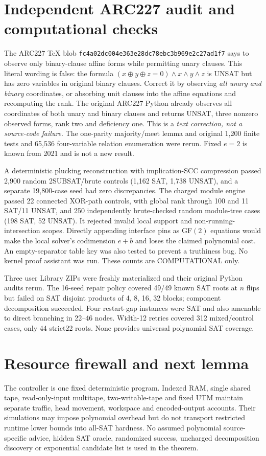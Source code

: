 \documentclass[11pt]{article}
\begin{document}
\section{Independent ARC227 audit and computational checks}
The ARC227 TeX blob
\texttt{fc4a02dc004e363e28dc78ebc3b969e2c27ad1f7}
says to observe only binary-clause affine forms while permitting
unary clauses. This literal wording is false: the formula
$(x\oplus y\oplus z=0)\land x\land y\land z$ is UNSAT but
has zero variables in original binary clauses. Correct it by
observing \emph{all unary and binary} coordinates, or
absorbing unit clauses into the affine equations and recomputing
the rank. The original ARC227 Python already observes all
coordinates of both unary and binary clauses and returns UNSAT,
three nonzero observed forms, rank two and deficiency one.
This is a \emph{text correction, not a source-code failure}.
The one-parity majority/meet lemma and original 1,200 finite
tests and 65,536 four-variable relation enumeration were rerun.
Fixed $e=2$ is known from 2021 and is not a new result.

A deterministic plucking reconstruction with implication-SCC
compression passed 2,900 random 2SUBSAT/brute controls
(1,162 SAT, 1,738 UNSAT), and a separate 19,800-case seed
had zero discrepancies. The charged module engine passed
22 connected XOR-path controls, with global rank through 100
and 11 SAT/11 UNSAT, and 250 independently brute-checked
random module-tree cases (198 SAT, 52 UNSAT). It rejected
invalid local support and non-running-intersection scopes.
Directly appending interface pins as GF$(2)$ equations would
make the local solver's codimension $e+b$ and loses the
claimed polynomial cost. An empty-separator table key was
also tested to prevent a truthiness bug. No kernel proof
assistant was run. These counts are COMPUTATIONAL only.

Three user Library ZIPs were freshly materialized and their
original Python audits rerun. The 16-seed repair policy covered
49/49 known SAT roots at $n$ flips but failed on SAT disjoint
products of 4, 8, 16, 32 blocks; component decomposition
succeeded. Four restart-gap instances were SAT and also
amenable to direct branching in 22--46 nodes. Width-12
retries covered 312 mixed/control cases, only 44 strict22
roots. None provides universal polynomial SAT coverage.

\section{Resource firewall and next lemma}
The controller is one fixed deterministic program.
Indexed RAM, single shared tape, read-only-input multitape,
two-writable-tape and fixed UTM maintain separate traffic,
head movement, workspace and encoded-output accounts.
Their simulations may impose polynomial overhead but do not
transport restricted runtime lower bounds into all-SAT hardness.
No assumed polynomial source-specific advice, hidden SAT oracle,
randomized success, uncharged decomposition discovery or
exponential candidate list is used in the theorem.
\end{document}
